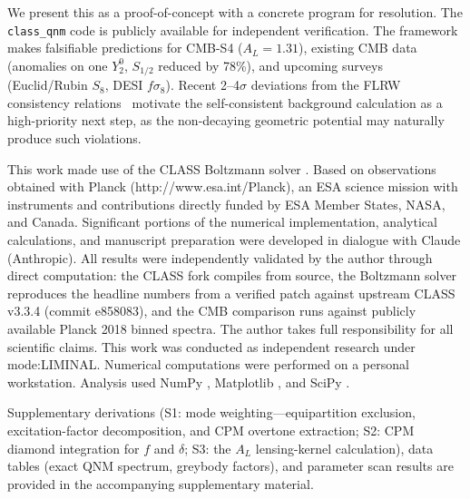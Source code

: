 \documentclass[aps,prd,twocolumn,superscriptaddress,showpacs,preprintnumbers,amsmath,amssymb,nofootinbib]{revtex4-2}
\begin{document}
We present this as a proof-of-concept with a concrete program for resolution. The \texttt{class\_qnm} code is publicly available for independent verification. The framework makes falsifiable predictions for CMB-S4 ($A_L = 1.31$), existing CMB data (anomalies on one $Y_2^0$, $S_{1/2}$ reduced by 78\%), and upcoming surveys (Euclid/Rubin $S_8$, DESI $f\sigma_8$). Recent 2--4$\sigma$ deviations from the FLRW consistency relations~\cite{KoksbangHeinesen2026a} motivate the self-consistent background calculation as a high-priority next step, as the non-decaying geometric potential may naturally produce such violations.


\begin{acknowledgments}
This work made use of the CLASS Boltzmann solver \citep{Blas2011}.  Based on observations obtained with Planck (http://www.esa.int/Planck), an ESA science mission with instruments and contributions directly funded by ESA Member States, NASA, and Canada. Significant portions of the numerical implementation, analytical calculations, and manuscript preparation were developed in dialogue with Claude (Anthropic). All results were independently validated by the author through direct computation: the CLASS fork compiles from source, the Boltzmann solver reproduces the headline numbers from a verified patch against upstream CLASS v3.3.4 (commit e858083), and the CMB comparison runs against publicly available Planck 2018 binned spectra. The author takes full responsibility for all scientific claims. This work was conducted as independent research under mode:LIMINAL. Numerical computations were performed on a personal workstation. Analysis used NumPy \citep{numpy}, Matplotlib \citep{matplotlib}, and SciPy \citep{scipy}. %
\end{acknowledgments}

Supplementary derivations (S1: mode weighting---equipartition exclusion, excitation-factor decomposition, and CPM overtone extraction; S2: CPM diamond integration for $f$ and $\delta$; S3: the $A_L$ lensing-kernel calculation), data tables (exact QNM spectrum, greybody factors), and parameter scan results are provided in the accompanying supplementary material.


\end{document}
